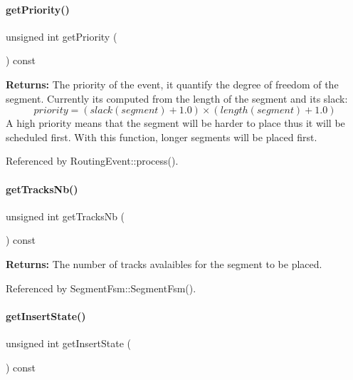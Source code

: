 \paragraph{\texorpdfstring{get\+Priority()}{getPriority()}}
{\footnotesize\ttfamily unsigned int get\+Priority (\begin{DoxyParamCaption}{ }\end{DoxyParamCaption}) const\hspace{0.3cm}{\ttfamily [inline]}}

{\bfseries Returns\+:} The priority of the event, it quantify the degree of freedom of the segment. Currently it\textquotesingle{}s computed from the length of the segment and it\textquotesingle{}s slack\+: \[ priority = (slack(segment)+1.0) \times (length(segment)+1.0) \] A high priority means that the segment will be harder to place thus it will be scheduled first. With this function, longer segments will be placed first. 

Referenced by Routing\+Event\+::process().

\mbox{\label{classKite_1_1RoutingEvent_acd1128e75a441b654e6d881c495db4f7}} 
\paragraph{\texorpdfstring{get\+Tracks\+Nb()}{getTracksNb()}}
{\footnotesize\ttfamily unsigned int get\+Tracks\+Nb (\begin{DoxyParamCaption}{ }\end{DoxyParamCaption}) const\hspace{0.3cm}{\ttfamily [inline]}}

{\bfseries Returns\+:} The number of tracks avalaibles for the segment to be placed. 

Referenced by Segment\+Fsm\+::\+Segment\+Fsm().

\mbox{\label{classKite_1_1RoutingEvent_a00f02910915e7deb857f023e5d584c08}} 
\paragraph{\texorpdfstring{get\+Insert\+State()}{getInsertState()}}
{\footnotesize\ttfamily unsigned int get\+Insert\+State (\begin{DoxyParamCaption}{ }\end{DoxyParamCaption}) const\hspace{0.3cm}{\ttfamily [inline]}}

